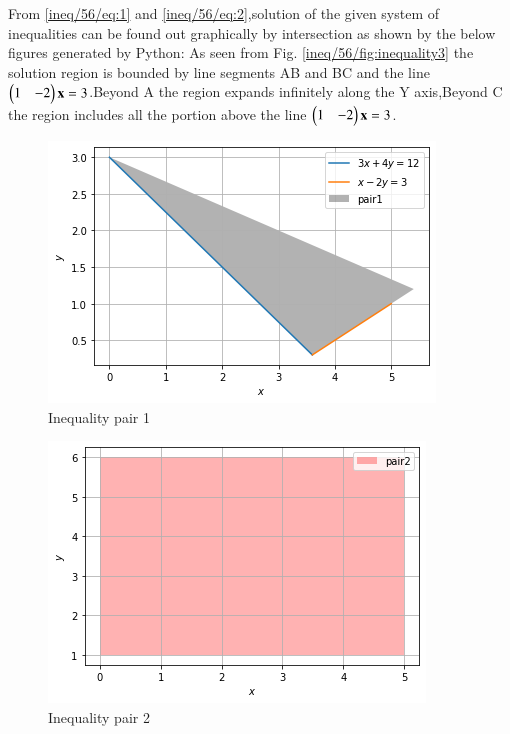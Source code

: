 From \eqref{ineq/56/eq:1} and \eqref{ineq/56/eq:2},solution of the given system of inequalities can be found out graphically by intersection as shown by the below figures generated by Python:
As seen from Fig. \ref{ineq/56/fig:inequality3} the solution region is bounded by line segments AB and BC and the line $\begin{pmatrix}1&-2\end{pmatrix}\mathbf{x}=3$.Beyond A the region expands infinitely along the Y axis,Beyond C the region includes all the portion above the line $\begin{pmatrix}1&-2\end{pmatrix}\mathbf{x}=3$.


\begin{figure}[!ht]
    \centering
    \includegraphics[width=\columnwidth]{solutions/su2021/2/56/Figure9_1.png}
    \caption{Inequality pair 1}
    \label{ineq/56/fig:inequalities1}	
    \end{figure}
    
    \begin{figure}[!ht]
    \centering
    \includegraphics[width=\columnwidth]{solutions/su2021/2/56/Figure9_2.png}
    \caption{Inequality pair 2}
    \label{ineq/56/fig:inequalities2}	
    \end{figure}
    
